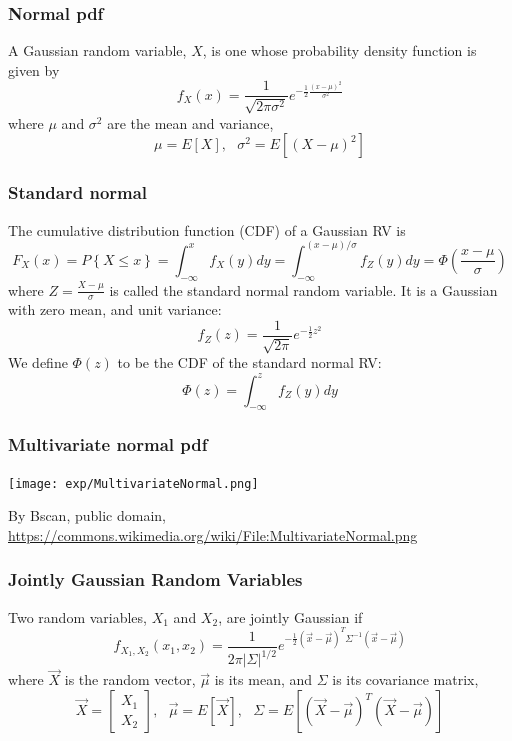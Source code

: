 \documentclass{beamer}
\begin{document}
\begin{frame}
  \frametitle{Normal pdf}

  A Gaussian random variable, $X$, is one whose probability density
  function is given by
  \[
  f_X(x) = \frac{1}{\sqrt{2\pi\sigma^2}}e^{-\frac{1}{2}\frac{(x-\mu)^2}{\sigma^2}}
  \]
  where $\mu$ and $\sigma^2$ are the mean and variance,
  \[
  \mu=E\left[X\right],~~~
  \sigma^2 = E\left[(X-\mu)^2\right]
  \]
\end{frame}

\begin{frame}
  \frametitle{Standard normal}

  The cumulative distribution function (CDF) of a Gaussian RV is
  \[
  F_X(x)=P\left\{X\le x\right\}
  = \int_{-\infty}^x f_X(y)dy
  = \int_{-\infty}^{(x-\mu)/\sigma} f_Z(y)dy
  = \Phi\left(\frac{x-\mu}{\sigma}\right)
  \]
  where $Z=\frac{X-\mu}{\sigma}$ is called the standard normal random
  variable.  It  is a Gaussian with zero mean, and unit variance:
  \[
  f_Z(z) = \frac{1}{\sqrt{2\pi}}e^{-\frac{1}{2}z^2}
  \]
  We define $\Phi(z)$  to be the CDF of the standard normal RV:
  \[
  \Phi(z) =  \int_{-\infty}^{z} f_Z(y)dy
  \]
\end{frame}

\begin{frame}
  \frametitle{Multivariate normal pdf}
  \centerline{\texttt{[image: exp/MultivariateNormal.png]}}
  \begin{tiny}
    By Bscan, public domain,
    \url{https://commons.wikimedia.org/wiki/File:MultivariateNormal.png}
  \end{tiny}
\end{frame}

\begin{frame}
  \frametitle{Jointly Gaussian Random Variables}

  Two random variables, $X_1$ and $X_2$, are jointly Gaussian if
  \[
  f_{X_1,X_2}(x_1,x_2) = \frac{1}{2\pi|\Sigma|^{1/2}}
  e^{-\frac{1}{2}(\vec{x}-\vec\mu)^T\Sigma^{-1}(\vec{x}-\vec\mu)}
  \]
  where $\vec{X}$ is the random vector, $\vec\mu$ is its mean, and $\Sigma$ is its
  covariance matrix,
  \[
  \vec{X}=\left[\begin{array}{c}X_1\\X_2\end{array}\right],~~~
  \vec\mu=E\left[\vec{X}\right],~~~
  \Sigma = E\left[(\vec{X}-\vec\mu)^T(\vec{X}-\vec\mu)\right]
  \]
\end{frame}
\end{document}

